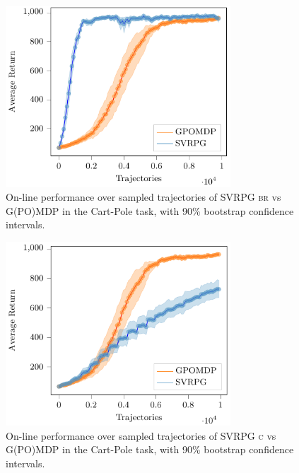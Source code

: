 \begin{figure}[h]
	\begin{minipage}[h]{1\textwidth}
		\centering
		\includegraphics[width=0.75\textwidth]{Images/Experiments/cart_pole_GPOMDP_vs_SVRPG_B_reuse.pdf}
		\vspace{-0.1in}
		\caption{On-line performance over sampled trajectories of \acs{SVRPG} \textsc{br} vs G(PO)MDP in the Cart-Pole task, with 90\% bootstrap confidence intervals.}
		\label{fig:cartpole2}
	\end{minipage}
	\vspace{-0.15in}
\end{figure}
\clearpage
\begin{figure}[h]
	\begin{minipage}[h]{1\textwidth}
		\centering
		\includegraphics[width=0.75\textwidth]{Images/Experiments/cart_pole_GPOMDP_vs_SVRPG_C.pdf}
		\vspace{-0.1in}
		\caption{On-line performance over sampled trajectories of \acs{SVRPG} \textsc{c} vs G(PO)MDP in the Cart-Pole task, with 90\% bootstrap confidence intervals.}
		\label{fig:cartpole3}
	\end{minipage}
	\vspace{-0.15in}
\end{figure}

